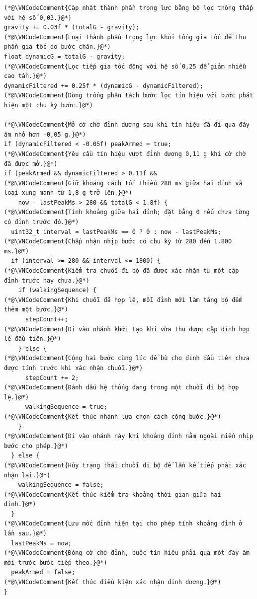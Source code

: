 \documentclass[12pt]{article}
\begin{document}
\Needspace{0.38\textheight}
\begin{lstlisting}[style=firmware,caption={Lọc gia tốc động và xác nhận chuỗi bước}]
(*@\VNCodeComment{Cập nhật thành phần trọng lực bằng bộ lọc thông thấp với hệ số 0,03.}@*)
gravity += 0.03f * (totalG - gravity);
(*@\VNCodeComment{Loại thành phần trọng lực khỏi tổng gia tốc để thu phần gia tốc do bước chân.}@*)
float dynamicG = totalG - gravity;
(*@\VNCodeComment{Lọc tiếp gia tốc động với hệ số 0,25 để giảm nhiễu cao tần.}@*)
dynamicFiltered += 0.25f * (dynamicG - dynamicFiltered);
(*@\VNCodeComment{Dòng trống phân tách bước lọc tín hiệu với bước phát hiện một chu kỳ bước.}@*)

(*@\VNCodeComment{Mở cờ chờ đỉnh dương sau khi tín hiệu đã đi qua đáy âm nhỏ hơn -0,05 g.}@*)
if (dynamicFiltered < -0.05f) peakArmed = true;
(*@\VNCodeComment{Yêu cầu tín hiệu vượt đỉnh dương 0,11 g khi cờ chờ đã được mở.}@*)
if (peakArmed && dynamicFiltered > 0.11f &&
(*@\VNCodeComment{Giữ khoảng cách tối thiểu 280 ms giữa hai đỉnh và loại xung mạnh từ 1,8 g trở lên.}@*)
    now - lastPeakMs > 280 && totalG < 1.8f) {
(*@\VNCodeComment{Tính khoảng giữa hai đỉnh; đặt bằng 0 nếu chưa từng có đỉnh trước đó.}@*)
  uint32_t interval = lastPeakMs == 0 ? 0 : now - lastPeakMs;
(*@\VNCodeComment{Chấp nhận nhịp bước có chu kỳ từ 280 đến 1.800 ms.}@*)
  if (interval >= 280 && interval <= 1800) {
(*@\VNCodeComment{Kiểm tra chuỗi đi bộ đã được xác nhận từ một cặp đỉnh trước hay chưa.}@*)
    if (walkingSequence) {
(*@\VNCodeComment{Khi chuỗi đã hợp lệ, mỗi đỉnh mới làm tăng bộ đếm thêm một bước.}@*)
      stepCount++;
(*@\VNCodeComment{Đi vào nhánh khởi tạo khi vừa thu được cặp đỉnh hợp lệ đầu tiên.}@*)
    } else {
(*@\VNCodeComment{Cộng hai bước cùng lúc để bù cho đỉnh đầu tiên chưa được tính trước khi xác nhận chuỗi.}@*)
      stepCount += 2;
(*@\VNCodeComment{Đánh dấu hệ thống đang trong một chuỗi đi bộ hợp lệ.}@*)
      walkingSequence = true;
(*@\VNCodeComment{Kết thúc nhánh lựa chọn cách cộng bước.}@*)
    }
(*@\VNCodeComment{Đi vào nhánh này khi khoảng đỉnh nằm ngoài miền nhịp bước cho phép.}@*)
  } else {
(*@\VNCodeComment{Hủy trạng thái chuỗi đi bộ để lần kế tiếp phải xác nhận lại.}@*)
    walkingSequence = false;
(*@\VNCodeComment{Kết thúc kiểm tra khoảng thời gian giữa hai đỉnh.}@*)
  }
(*@\VNCodeComment{Lưu mốc đỉnh hiện tại cho phép tính khoảng đỉnh ở lần sau.}@*)
  lastPeakMs = now;
(*@\VNCodeComment{Đóng cờ chờ đỉnh, buộc tín hiệu phải qua một đáy âm mới trước bước tiếp theo.}@*)
  peakArmed = false;
(*@\VNCodeComment{Kết thúc điều kiện xác nhận đỉnh dương.}@*)
}
\end{lstlisting}
\end{document}
